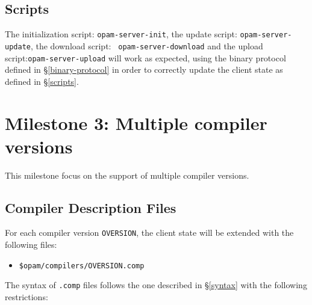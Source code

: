 \documentclass[a4paper,11pt]{article}
\begin{document}
\subsection{Scripts}

The initialization script: {\tt opam-server-init}, the update script:
{\tt opam-server-update}, the download script: {\tt
  opam-server-download} and the upload script:{\tt opam-server-upload} will work as
expected, using the binary protocol defined in
\S\ref{binary-protocol} in order to correctly update the client state as
defined in \S\ref{scripts}.


\section{Milestone 3: Multiple compiler versions}

This milestone focus on the support of multiple compiler versions.

\subsection{Compiler Description Files}

For each compiler version {\tt OVERSION}, the client state will be
extended with the following files:

\begin{itemize}
\item {\tt \$opam/compilers/OVERSION.comp}
\end{itemize}

The syntax of {\tt .comp} files follows the one described in
\S\ref{syntax} with the following restrictions:
\end{document}
